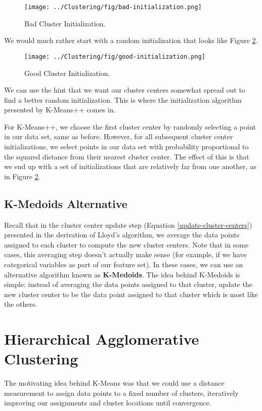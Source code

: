 \begin{figure}
    \centering
    \texttt{[image: ../Clustering/fig/bad-initialization.png]}
    \caption{Bad Cluster Initialization.}
    \label{fig:bad-init}
\end{figure}

We would much rather start with a random initialization that looks like Figure \ref{fig:good-init}.

\begin{figure}
    \centering
    \texttt{[image: ../Clustering/fig/good-initialization.png]}
    \caption{Good Cluster Initialization.}
    \label{fig:good-init}
\end{figure}

We can use the hint that we want our cluster centers somewhat spread out to find a better random initialization. This is where the initialization algorithm presented by K-Means++ comes in.

For K-Means++, we choose the first cluster center by randomly selecting a point in our data set, same as before. However, for all subsequent cluster center initializations, we select points in our data set with probability proportional to the squared distance from their nearest cluster center. The effect of this is that we end up with a set of initializations that are relatively far from one another, as in Figure \ref{fig:good-init}.

\subsection{K-Medoids Alternative}
Recall that in the cluster center update step (Equation \ref{update-cluster-centers}) presented in the derivation of Lloyd's algorithm, we average the data points assigned to each cluster to compute the new cluster centers. Note that in some cases, this averaging step doesn't actually make sense (for example, if we have categorical variables as part of our feature set). In these cases, we can use an alternative algorithm known as \textbf{K-Medoids}. The idea behind K-Medoids is simple: instead of averaging the data points assigned to that cluster, update the new cluster center to be the data point assigned to that cluster which is most like the others.

\section{Hierarchical Agglomerative Clustering}
The motivating idea behind K-Means was that we could use a distance measurement to assign data points to a fixed number of clusters, iteratively improving our assignments and cluster locations until convergence.

